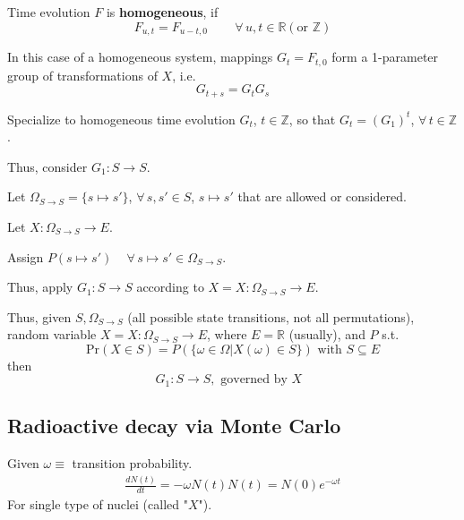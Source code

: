 \documentclass[10pt]{amsart}
\begin{document}
\begin{multicols*}{2}
Time evolution $F$ is \textbf{homogeneous}, if
\[
F_{u,t} = F_{u-t,0} \qquad \, \forall \, u,t \in \mathbb{R} (\text{or } \mathbb{Z})
\]

In this case of a homogeneous system, mappings $G_t = F_{t,0}$ form a 1-parameter group of transformations of $X$, i.e.
\[
G_{t+s} = G_t G_s
\]

Specialize to homogeneous time evolution $G_t$, $t\in \mathbb{Z}$, so that $G_t = (G_1)^t$, $\forall \, t \in \mathbb{Z}$.

Thus, consider $G_1 : S \to S$.  

Let $\Omega_{S\to S} = \lbrace s \mapsto s' \rbrace$, $\forall \, s, s' \in S$, $s\mapsto s'$ that are allowed or considered.

Let $X: \Omega_{S \to S} \to E$. 

Assign $P(s\mapsto s') \quad \, \forall \, s \mapsto s' \in \Omega_{S \to S}$.

Thus, apply $G_1: S \to S$ according to $X = X: \Omega_{S\to S} \to E$.

Thus, given $\boxed{ S, \Omega_{S\to S} }$ (all possible state transitions, not all permutations), random variable $\boxed{ X = X: \Omega_{S \to S} \to E }$, where $E = \mathbb{R}$ (usually), and $P$ s.t. 
\begin{equation}
\boxed{ \text{Pr}(X \in S) = P(\lbrace \omega \in \Omega | X(\omega) \in S\rbrace) \text{ with } S \subseteq E }
\end{equation}
then
\begin{equation}
\boxed{G_1 : S \to S}, \text{ governed by $X$ }
\end{equation}

\subsection{Radioactive decay via Monte Carlo}

Given $\omega \equiv $ transition probability. 
\[
\begin{gathered} 
\frac{dN(t)}{dt} = -\omega N(t)
N(t) = N(0) e^{-\omega t}
\end{gathered} 
\] 
For single type of nuclei (called "$X$").


\end{multicols*}
\end{document}
